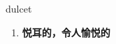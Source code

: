 
\begin{frame}
{\huge dulcet}
\begin{center}
\begin{enumerate}\Large
  \item \textbf{悦耳的，令人愉悦的}
\end{enumerate}
\end{center}
\end{frame}
